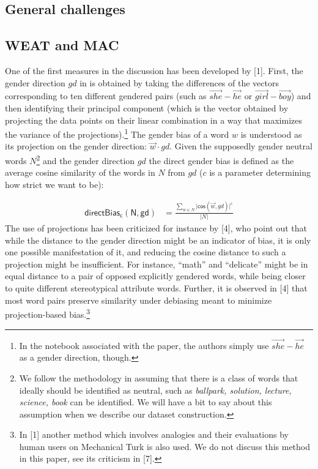 \documentclass[
  10pt,
  dvipsnames,enabledeprecatedfontcommands]{scrartcl}
\begin{document}
\hypertarget{general-challenges}{%
\subsection{General challenges}\label{general-challenges}}

\hypertarget{weat-and-mac}{%
\subsection{WEAT and MAC}\label{weat-and-mac}}

One of the first measures in the discussion has been developed by
{[}1{]}. First, the gender direction \(gd\) in is obtained by taking the
differences of the vectors corresponding to ten different gendered pairs
(such as \(\overrightarrow{she} - \overrightarrow{he}\) or
\(\overrightarrow{girl} - \overrightarrow{boy}\)) and then identifying
their principal component (which is the vector obtained by projecting
the data points on their linear combination in a way that maximizes the
variance of the projections).\footnote{In the notebook associated with
  the paper, the authors simply use
  \(\overrightarrow{she} - \overrightarrow{he}\) as a gender direction,
  though.} The gender bias of a word \(w\) is understood as its
projection on the gender direction: \(\vec{w} \cdot gd\). Given the
supposedly gender neutral words \(N\)\footnote{We follow the methodology
  in assuming that there is a class of words that ideally should be
  identified as neutral, such as
  \emph{ballpark, solution, lecture, science, book} can be identified.
  We will have a bit to say about this assumption when we describe our
  dataset construction.}  and the gender
direction \(gd\) the direct gender bias is defined as the average cosine
similarity of the words in \(N\) from \(gd\) (\(c\) is a parameter
determining how strict we want to be):

\footnotesize

\begin{align}
\mathsf{directBias_c(N,gd)} & = \frac{\sum_{w\in N}\vert \mathsf{cos}(\vec{w},gd)\vert^c}{\vert N \vert }
\end{align} \normalsize  The use of projections has been criticized for
instance by {[}4{]}, who point out that while the distance to the gender
direction might be an indicator of bias, it is only one possible
manifestation of it, and reducing the cosine distance to such a
projection might be insufficient. For instance, ``math'' and
``delicate'' might be in equal distance to a pair of opposed explicitly
gendered words, while being closer to quite different stereotypical
attribute words. Further, it is observed in {[}4{]} that most word pairs
preserve similarity under debiasing meant to minimize projection-based
bias.\footnote{In {[}1{]} another method which involves analogies and
  their evaluations by human users on Mechanical Turk is also used. We
  do not discuss this method in this paper, see its criticism in
  {[}7{]}.}
\end{document}
